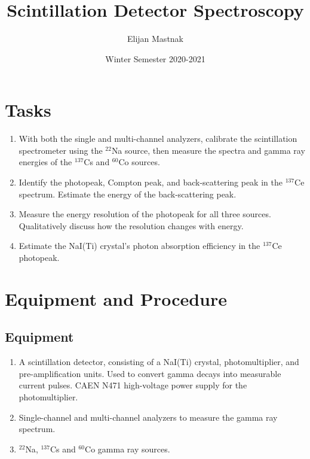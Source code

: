 \documentclass[11pt, a4paper]{article}
\newcommand{\isoptope}[2]{${}^{#2}${#1}}
\begin{document}
\title{Scintillation Detector Spectroscopy}
\author{Elijan Mastnak}
\date{Winter Semester 2020-2021}
\maketitle

\tableofcontents
		
\newpage

\section{Tasks}
\begin{enumerate}
	
	\item With both the single and multi-channel analyzers, calibrate the scintillation spectrometer using the \isoptope{Na}{22} source, then measure the spectra and gamma ray energies of the \isoptope{Cs}{137} and \isoptope{Co}{60} sources.

	
	\item Identify the photopeak, Compton peak, and back-scattering peak in the \isoptope{Ce}{137} spectrum. Estimate the energy of the back-scattering peak.
	
	\item Measure the energy resolution of the photopeak for all three sources. Qualitatively discuss how the resolution changes with energy.
	
	
	\item Estimate the NaI(Ti) crystal's photon absorption efficiency in the \isoptope{Ce}{137} photopeak.
	
\end{enumerate}

\section{Equipment and Procedure}
\subsection{Equipment}
\begin{enumerate}
	\item A scintillation detector, consisting of a NaI(Ti) crystal, photomultiplier, and pre-amplification units. Used to convert gamma decays into measurable current pulses. CAEN N471 high-voltage power supply for the photomultiplier.
	
	\item Single-channel and multi-channel analyzers to measure the gamma ray spectrum. 
	
	\item \isoptope{Na}{22}, \isoptope{Cs}{137} and \isoptope{Co}{60} gamma ray sources.
\end{enumerate}
\end{document}

